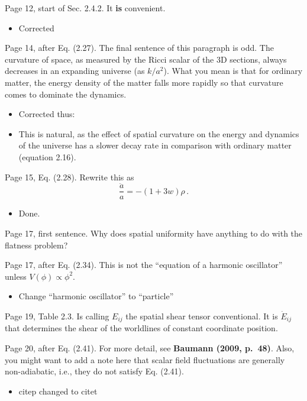 \documentclass[11pt]{article}
\newcommand{\todo}[1]{{\color{red} #1}}
\begin{document}
\begin{enumerate}
\item Page 12, start of Sec. 2.4.2. It \textbf{is} convenient.
  \begin{itemize}
    \item Corrected
  \end{itemize}
\item Page 14, after Eq. (2.27). The final sentence of this paragraph
  is odd. The curvature of space, as measured by the Ricci scalar of
  the 3D sections, always decreases in an expanding universe (as
  $k/a^2$). What you mean is that for ordinary matter, the energy
  density of the matter falls more rapidly so that curvature comes to
  dominate the dynamics.
  \begin{itemize}
    \item Corrected thus:
    \item This is natural, as the effect of spatial curvature on the energy and dynamics of the universe has a slower decay rate in comparison with ordinary matter (equation 2.16).
  \end{itemize}
\item Page 15, Eq. (2.28). Rewrite this as 
%
\begin{equation}
\frac{\ddot{a}}{a} = - (1+3w) \rho \, . \tag{2.28}
\end{equation}
%
\begin{itemize}
  \item Done.
\end{itemize}
\todo{%
\item Page 17, first sentence. Why does spatial uniformity have
  anything to do with the flatness problem?
}
\item Page 17, after Eq. (2.34). This is not the ``equation of a
  harmonic oscillator'' unless $V(\phi) \propto \phi^2$.
  \begin{itemize}
    \item Change ``harmonic oscillator'' to ``particle''
  \end{itemize}
  \todo{
\item Page 19, Table 2.3. Is calling $E_{ij}$ the spatial shear tensor
  conventional. It is $\dot{E}_{ij}$ that determines the shear of the
  worldlines of constant coordinate position.
}
\item Page 20, after Eq. (2.41). For more detail, see \textbf{Baumann
    (2009, p.~48)}. Also, you might want to add a note here that
  scalar field fluctuations are generally non-adiabatic, i.e., they do
  not satisfy Eq. (2.41).
  \begin{itemize}
    \item citep changed to citet

\end{itemize}
\end{enumerate}
\end{document}
